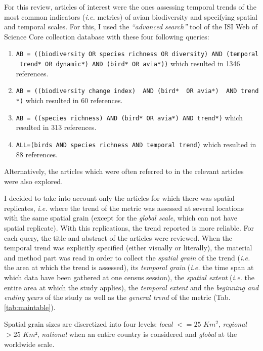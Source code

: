 \documentclass[
  12pt,
  oneside]{report}
\begin{document}
For this review, articles of interest were the ones assessing temporal trends of the most common indicators (\emph{i.e.} metrics) of avian biodiversity and specifying spatial and temporal scales. For this, I used the \emph{\enquote{advanced search}} tool of the ISI Web of Science Core collection database with these four following queries:

\begin{enumerate}
\def\labelenumi{\arabic{enumi}.}
\item
  \texttt{AB\ =\ ((biodiversity\ OR\ species\ richness\ OR\ diversity)\ AND\ (temporal\ trend*\ OR\ dynamic*)\ AND\ (bird*\ OR\ avia*))} which resulted in 1346 references.
\item
  \texttt{AB\ =\ ((biodiversity\ change\ index)\ \ AND\ (bird*\ \ OR\ avia*)\ \ AND\ trend*)} which resulted in 60 references.
\item
  \texttt{AB\ =\ ((species\ richness)\ AND\ (bird*\ OR\ avia*)\ AND\ trend*)} which resulted in 313 references.
\item
  \texttt{ALL=(birds\ AND\ species\ richness\ AND\ temporal\ trend)} which resulted in 88 references.
\end{enumerate}

Alternatively, the articles which were often referred to in the relevant articles were also explored.

I decided to take into account only the articles for which there was spatial replicates, \emph{i.e.} where the trend of the metric was assessed at several locations with the same spatial grain (except for the \emph{global scale}, which can not have spatial replicate). With this replications, the trend reported is more reliable. For each query, the title and abstract of the articles were reviewed. When the temporal trend was explicitly specified (either visually or literally), the material and method part was read in order to collect the \emph{spatial grain} of the trend (\emph{i.e.} the area at which the trend is assessed), its \emph{temporal grain} (\emph{i.e.} the time span at which data have been gathered at one census session), the \emph{spatial extent} (\emph{i.e.} the entire area at which the study applies), the \emph{temporal extent} and the \emph{beginning and ending years} of the study as well as the \emph{general trend} of the metric (Tab. \ref{tab:maintable}).

Spatial grain sizes are discretized into four levels: \emph{local} \(<= 25\) \(Km^2\), \emph{regional} \(> 25\) \(Km²\), \emph{national} when an entire country is considered and \emph{global} at the worldwide scale.
\end{document}
